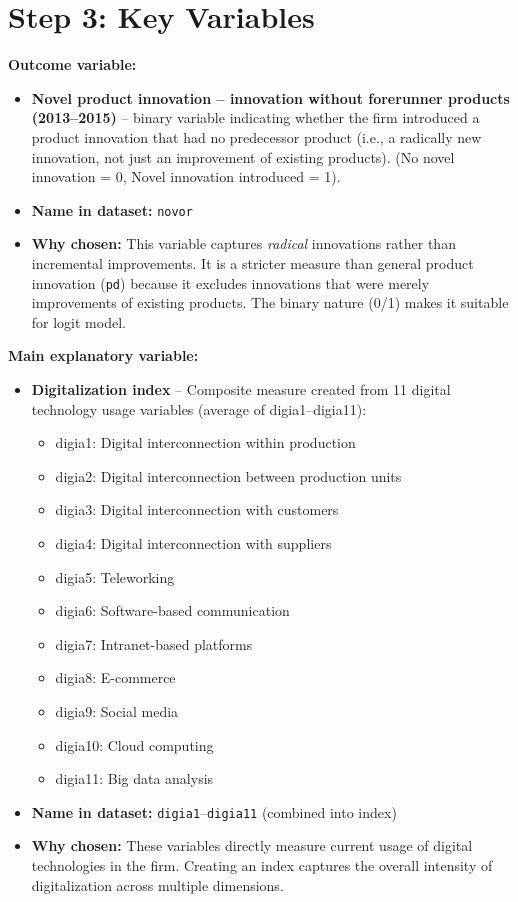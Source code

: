 \documentclass[a4paper,12pt]{article}
\begin{document}
\section*{Step 3: Key Variables}

\textbf{Outcome variable:}
\begin{itemize}
    \item \textbf{Novel product innovation -- innovation without forerunner products (2013--2015)} -- binary variable indicating whether the firm introduced a product innovation that had no predecessor product (i.e., a radically new innovation, not just an improvement of existing products). (No novel innovation = 0, Novel innovation introduced = 1).
    \item \textbf{Name in dataset:} \texttt{novor}
    \item \textbf{Why chosen:} This variable captures \textit{radical} innovations rather than incremental improvements. It is a stricter measure than general product innovation (\texttt{pd}) because it excludes innovations that were merely improvements of existing products. The binary nature (0/1) makes it suitable for logit model.
\end{itemize}

\textbf{Main explanatory variable:}
\begin{itemize}
    \item \textbf{Digitalization index} -- Composite measure created from 11 digital technology usage variables (average of digia1--digia11):
    \begin{itemize}
        \item digia1: Digital interconnection within production
        \item digia2: Digital interconnection between production units
        \item digia3: Digital interconnection with customers
        \item digia4: Digital interconnection with suppliers
        \item digia5: Teleworking
        \item digia6: Software-based communication
        \item digia7: Intranet-based platforms
        \item digia8: E-commerce
        \item digia9: Social media
        \item digia10: Cloud computing
        \item digia11: Big data analysis
    \end{itemize}
    \item \textbf{Name in dataset:} \texttt{digia1}--\texttt{digia11} (combined into index)
    \item \textbf{Why chosen:} These variables directly measure current usage of digital technologies in the firm. Creating an index captures the overall intensity of digitalization across multiple dimensions.
\end{itemize}
\end{document}
